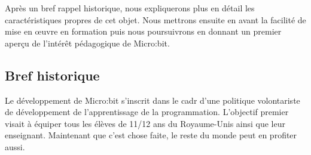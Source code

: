 \documentclass[letterpaper,10pt,french]{sphinxmanual}
\begin{document}
Après un bref rappel historique, nous expliquerons plus en
détail les caractéristiques propres de cet objet.
Nous mettrons ensuite en avant la facilité de mise en œuvre en
formation puis nous poursuivrons en donnant un premier aperçu
de l’intérêt pédagogique de Micro:bit.



\subsection{Bref historique}
\label{\detokenize{decouverte/05_generalite:bref-historique}}
Le développement de Micro:bit s’inscrit dans le cadr
d’une politique volontariste de développement de
l’apprentissage de la programmation. L’objectif premier
visait à équiper tous les élèves de 11/12 ans du
Royaume-Unis ainsi que leur enseignant. Maintenant
que c’est chose faite, le reste du monde peut en
profiter aussi.

\end{document}
